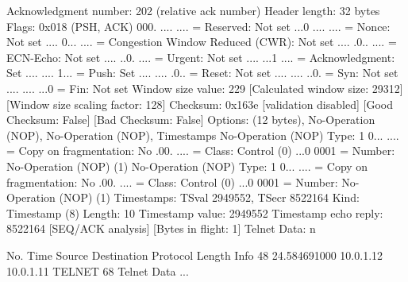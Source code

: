     Acknowledgment number: 202    (relative ack number)
    Header length: 32 bytes
    Flags: 0x018 (PSH, ACK)
        000. .... .... = Reserved: Not set
        ...0 .... .... = Nonce: Not set
        .... 0... .... = Congestion Window Reduced (CWR): Not set
        .... .0.. .... = ECN-Echo: Not set
        .... ..0. .... = Urgent: Not set
        .... ...1 .... = Acknowledgment: Set
        .... .... 1... = Push: Set
        .... .... .0.. = Reset: Not set
        .... .... ..0. = Syn: Not set
        .... .... ...0 = Fin: Not set
    Window size value: 229
    [Calculated window size: 29312]
    [Window size scaling factor: 128]
    Checksum: 0x163e [validation disabled]
        [Good Checksum: False]
        [Bad Checksum: False]
    Options: (12 bytes), No-Operation (NOP), No-Operation (NOP), Timestamps
        No-Operation (NOP)
            Type: 1
                0... .... = Copy on fragmentation: No
                .00. .... = Class: Control (0)
                ...0 0001 = Number: No-Operation (NOP) (1)
        No-Operation (NOP)
            Type: 1
                0... .... = Copy on fragmentation: No
                .00. .... = Class: Control (0)
                ...0 0001 = Number: No-Operation (NOP) (1)
        Timestamps: TSval 2949552, TSecr 8522164
            Kind: Timestamp (8)
            Length: 10
            Timestamp value: 2949552
            Timestamp echo reply: 8522164
    [SEQ/ACK analysis]
        [Bytes in flight: 1]
Telnet
    Data: n

No.     Time           Source                Destination           Protocol Length Info
     48 24.584691000   10.0.1.12             10.0.1.11             TELNET   68     Telnet Data ...

